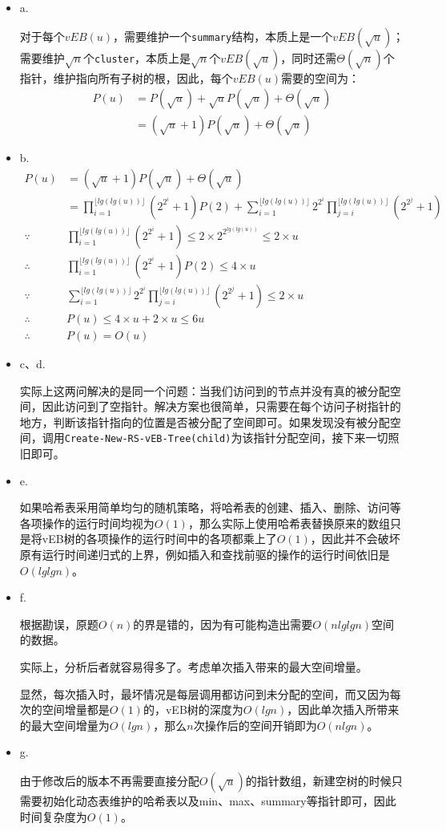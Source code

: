 \documentclass[]{article}
\begin{document}
\begin{itemize}
\item
  a.

  对于每个\(vEB(u)\)，需要维护一个\texttt{summary}结构，本质上是一个\(vEB(\sqrt{u})\)；需要维护\(\sqrt{n}\)个\texttt{cluster}，本质上是\(\sqrt{n}\)个\(vEB(\sqrt{u})\)，同时还需\(\Theta(\sqrt{n})\)个指针，维护指向所有子树的根，因此，每个\(vEB(u)\)需要的空间为：
\[
  \begin{aligned}
  	P(u) &=  P(\sqrt{u}) + \sqrt{u}P(\sqrt{u}) + \Theta(\sqrt{u}) \\
  	&= (\sqrt{u} + 1)P(\sqrt{u}) + \Theta(\sqrt{u})
  \end{aligned}
\]
\item
  b.
\[
  \begin{aligned}
  	P(u) &= (\sqrt{u} + 1)P(\sqrt{u}) + \Theta(\sqrt{u}) \\
  	&= \prod_{i=1}^{\lfloor lg(lg(u)) \rfloor} (2^{2^i} + 1) P(2) + \sum_{i=1}^{\lfloor lg(lg(u)) \rfloor} 2^{2^i} \prod_{j=i}^{\lfloor lg(lg(u)) \rfloor} (2^{2^j} + 1) \\
  	\because & \prod_{i=1}^{\lfloor lg(lg(u)) \rfloor} (2^{2^i} + 1) \leq 2 \times 2^{2^{lg(lg(u))}} \leq 2 \times u \\
  \therefore & \prod_{i=1}^{\lfloor lg(lg(u)) \rfloor} (2^{2^i} + 1) P(2) \leq 4 \times u \\
  \because & \sum_{i=1}^{\lfloor lg(lg(u)) \rfloor} 2^{2^i} \prod_{j=i}^{\lfloor lg(lg(u)) \rfloor} (2^{2^j} + 1) \leq 2 \times u \\
  \therefore & P(u) \leq 4\times u + 2 \times u \leq 6u \\
  \therefore & P(u) = O(u)
  \end{aligned}
\]
\item
  c、d.

  实际上这两问解决的是同一个问题：当我们访问到的节点并没有真的被分配空间，因此访问到了空指针。解决方案也很简单，只需要在每个访问子树指针的地方，判断该指针指向的位置是否被分配了空间即可。如果发现没有被分配空间，调用\texttt{Create-New-RS-vEB-Tree(child)}为该指针分配空间，接下来一切照旧即可。
\item
  e.

  如果哈希表采用简单均匀的随机策略，将哈希表的创建、插入、删除、访问等各项操作的运行时间均视为\(O(1)\)，那么实际上使用哈希表替换原来的数组只是将vEB树的各项操作的运行时间中的各项都乘上了\(O(1)\)，因此并不会破坏原有运行时间递归式的上界，例如插入和查找前驱的操作的运行时间依旧是\(O(lglgn)\)。
\item
  f.

  根据勘误，原题\(O(n)\)的界是错的，因为有可能构造出需要\(O(nlglgn)\)空间的数据。

  实际上，分析后者就容易得多了。考虑单次插入带来的最大空间增量。

  显然，每次插入时，最坏情况是每层调用都访问到未分配的空间，而又因为每次的空间增量都是\(O(1)\)的，vEB树的深度为\(O(lgn)\)，因此单次插入所带来的最大空间增量为\(O(lgn)\)，那么\(n\)次操作后的空间开销即为\(O(nlgn)\)。
\item
  g.

  由于修改后的版本不再需要直接分配\(O(\sqrt{u})\)的指针数组，新建空树的时候只需要初始化动态表维护的哈希表以及min、max、summary等指针即可，因此时间复杂度为\(O(1)\)。
\end{itemize}
\end{document}
